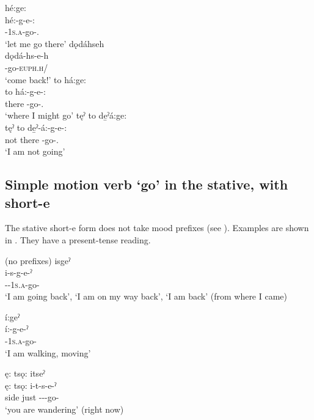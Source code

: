\ea\label{ex:simplemotex600} 
\ea hé:ge:\\\label{ex:simplemotex600a} 
\gll hé:-g-e-:\\
 {\translocative}-\textsc{1s.a}-go-{\purposive}.{\noaspect}\\
\glt `let me go there'
\ex dǫdáhseh\\\label{ex:simplemotex600b} 
\gll dǫdá-hs-e-h\\
 {\dualiccislocative}-go-\textsc{euph.h}/{\noaspect}\footnotemark{}\\
\glt `come back!⁠'
\newpage
\ex to há:ge:\\\label{ex:simplemotex600c} 
\gll to há:-g-e-:\\
 there {\translocativeindefinite}-go-{\purposive}.{\noaspect}\\
\glt `where I might go'
\ex tęˀ to de̱ˀá:ge:\\\label{ex:simplemotex600d} 
\gll tęˀ to de̱ˀ-á:-g-e-:\\
not there -go-{\purposive}.{\noaspect}\\
\glt `I am not going'
\z
\z


\subsection{Simple motion verb  ‘go’ in the stative, with short-e} \label{ch:Simple motion verb [e] ‘go’ in the stative, with short [e-ˀ]}
The stative short-e  form does not take mood prefixes (see ). Examples are shown in . They have a present-tense reading.

\ea\label{ex:simplemotex17}  {\stative} (no {\mood} prefixes)
\ea isgeˀ \\
\gll i-s-g-e-ˀ\\
{\prothetic}-{\repetitive}-\textsc{1s.a}-go-{\stative}\\
\glt ‘I am going back’, ‘I am on my way back’, ‘I am back’ (from where I came)

\ex í:geˀ\\
\gll í:-g-e-ˀ\\
 {\prothetic}-\textsc{1s.a}-go-{\stative}\\
\glt `I am walking, moving'

\ex ę: tsǫ: itseˀ \\
\gll ę: tsǫ: i-t-s-e-ˀ\\
side just {\prothetic}-{\cislocative}--go-{\stative}\\
\glt ‘you are wandering’ (right now) 

